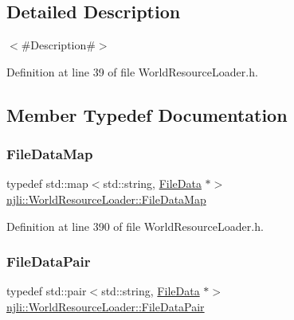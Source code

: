\subsection{Detailed Description}
$<$\#\+Description\#$>$ 

Definition at line 39 of file World\+Resource\+Loader.\+h.



\subsection{Member Typedef Documentation}
\mbox{\label{classnjli_1_1_world_resource_loader_a5a3b461a48cb2119251464a5e117533d}} 
\subsubsection{\texorpdfstring{File\+Data\+Map}{FileDataMap}}
{\footnotesize\ttfamily typedef std\+::map$<$std\+::string, \mbox{\hyperlink{structnjli_1_1_world_resource_loader_1_1_file_data}{File\+Data}} $\ast$$>$ \mbox{\hyperlink{classnjli_1_1_world_resource_loader_a5a3b461a48cb2119251464a5e117533d}{njli\+::\+World\+Resource\+Loader\+::\+File\+Data\+Map}}\hspace{0.3cm}{\ttfamily [private]}}



Definition at line 390 of file World\+Resource\+Loader.\+h.

\mbox{\label{classnjli_1_1_world_resource_loader_a4c3e96bc649a040e1c74c71e5fab3b8b}} 
\subsubsection{\texorpdfstring{File\+Data\+Pair}{FileDataPair}}
{\footnotesize\ttfamily typedef std\+::pair$<$std\+::string, \mbox{\hyperlink{structnjli_1_1_world_resource_loader_1_1_file_data}{File\+Data}} $\ast$$>$ \mbox{\hyperlink{classnjli_1_1_world_resource_loader_a4c3e96bc649a040e1c74c71e5fab3b8b}{njli\+::\+World\+Resource\+Loader\+::\+File\+Data\+Pair}}\hspace{0.3cm}{\ttfamily [private]}}



